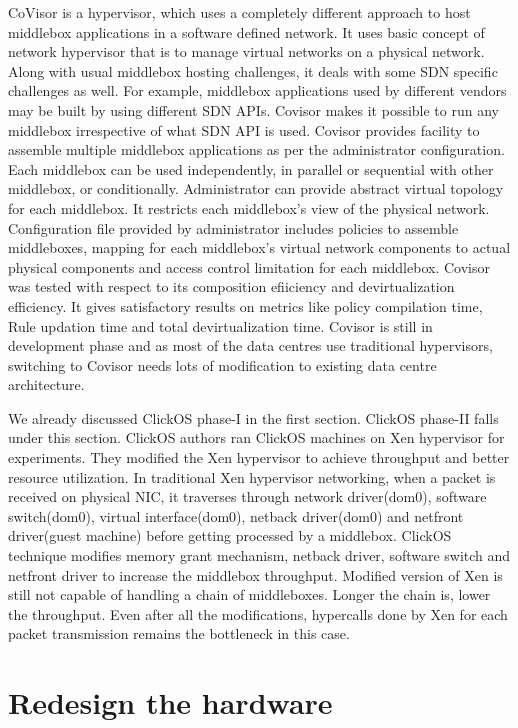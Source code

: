 \documentclass[a4paper,11pt]{report}
\begin{document}
CoVisor\cite{R5} is a hypervisor, which uses a completely different approach to host middlebox applications in a software defined network. It uses basic concept of network hypervisor that is to manage virtual networks on a physical network. Along with usual middlebox hosting challenges, it deals with some SDN specific challenges as well. For example, middlebox applications used by different vendors may be built by using different SDN APIs. Covisor makes it possible to run any middlebox irrespective of what SDN API is used. Covisor provides facility to assemble multiple middlebox applications as per the administrator configuration. Each middlebox can be used independently, in parallel or sequential with other middlebox, or conditionally. Administrator can provide abstract virtual topology for each middlebox. It restricts each middlebox's view of the physical network. Configuration file provided by administrator includes policies to assemble middleboxes, mapping for each middlebox's virtual network components to actual physical components and access control limitation for each middlebox. Covisor was tested with respect to its composition efiiciency and devirtualization efficiency. It gives satisfactory results on metrics like policy compilation time, Rule updation time and total devirtualization time. Covisor is still in development phase and as most of the data centres use traditional hypervisors, switching to Covisor needs lots of modification to existing data centre architecture. 

We already discussed ClickOS\cite{R1} phase-I in the first section. ClickOS phase-II falls under this section. ClickOS authors ran ClickOS machines on Xen hypervisor for experiments. They modified the Xen hypervisor to achieve throughput and better resource utilization. In traditional Xen hypervisor networking, when a packet is received on physical NIC, it traverses through network driver(dom0), software switch(dom0), virtual interface(dom0), netback driver(dom0) and netfront driver(guest machine) before getting processed by a middlebox. ClickOS technique modifies memory grant mechanism, netback driver, software switch and netfront driver to increase the middlebox throughput. Modified version of Xen is still not capable of handling a chain of middleboxes. Longer the chain is, lower the throughput. Even after all the modifications, hypercalls done by Xen for each packet transmission remains the bottleneck in this case.            
\section{Redesign the hardware}
\end{document}
